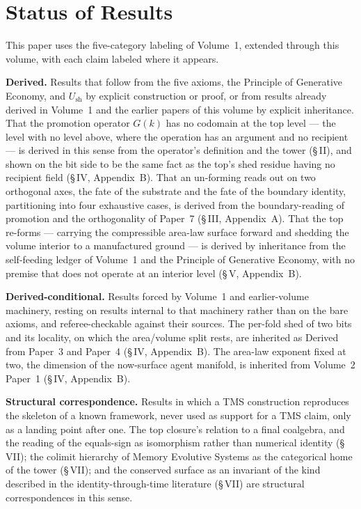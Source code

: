 \documentclass[11pt,oneside]{report}
\theoremstyle{definition}
\theoremstyle{remark}
\begin{document}
\section*{Status of Results}

This paper uses the five-category labeling of Volume~1, extended through this volume, with each claim
labeled where it appears.

\textbf{Derived.} Results that follow from the five axioms, the Principle of Generative Economy, and
\ensuremath{U_{\mathrm{sh}}} by explicit construction or proof, or from results already derived in
Volume~1 and the earlier papers of this volume by explicit inheritance. That the promotion operator
\ensuremath{G(k)} has no codomain at the top level --- the level with no level above, where the
operation has an argument and no recipient --- is derived in this sense from the operator's
definition and the tower (\S\,II), and shown on the bit side to be the same fact as the top's shed
residue having no recipient field (\S\,IV, Appendix~B). That an un-forming reads out on two
orthogonal axes, the fate of the substrate and the fate of the boundary identity, partitioning into
four exhaustive cases, is derived from the boundary-reading of promotion and the orthogonality of
Paper~7 (\S\,III, Appendix~A). That the top re-forms --- carrying the compressible area-law surface
forward and shedding the volume interior to a manufactured ground --- is derived by inheritance from
the self-feeding ledger of Volume~1 and the Principle of Generative Economy, with no premise that
does not operate at an interior level (\S\,V, Appendix~B).

\textbf{Derived-conditional.} Results forced by Volume~1 and earlier-volume machinery, resting on
results internal to that machinery rather than on the bare axioms, and referee-checkable against
their sources. The per-fold shed of two bits and its locality, on which the area/volume split rests,
are inherited as Derived from Paper~3 and Paper~4 (\S\,IV, Appendix~B). The area-law exponent fixed
at two, the dimension of the now-surface agent manifold, is inherited from Volume~2 Paper~1 (\S\,IV,
Appendix~B).

\textbf{Structural correspondence.} Results in which a TMS construction reproduces the skeleton of a
known framework, never used as support for a TMS claim, only as a landing point after one. The top
closure's relation to a final coalgebra, and the reading of the equals-sign as isomorphism rather
than numerical identity (\S\,VII); the colimit hierarchy of Memory Evolutive Systems as the
categorical home of the tower (\S\,VII); and the conserved surface as an invariant of the kind
described in the identity-through-time literature (\S\,VII) are structural correspondences in this
sense.
\end{document}
